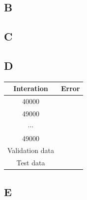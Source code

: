 \documentclass{article}
\begin{document}
        \subsection{B}
        \subsection{C}
        \subsection{D}
            \begin{tabular}{|c|c|}
                \hline
                Interation & Error \\
                \hline
                40000 & \\
                \hline
                49000 & \\
                \hline
                $\cdots$ & \\
                \hline
                49000 & \\
                \hline
                Validation data & \\
                \hline
                Test data & \\
                \hline
            \end{tabular}
        \subsection{E}
\end{document}
